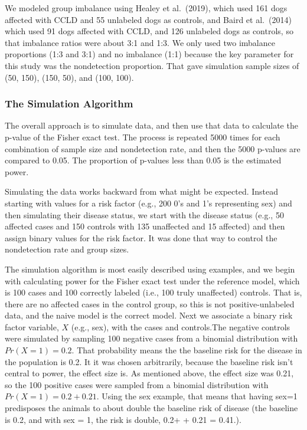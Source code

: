 \documentclass[
]{article}
\begin{document}
We modeled group imbalance using Healey et al.~(2019), which used 161
dogs affected with CCLD and 55 unlabeled dogs as controls, and Baird et
al.~(2014) which used 91 dogs affected with CCLD, and 126 unlabeled dogs
as controls, so that imbalance ratios were about 3:1 and 1:3.
\cite{bcioa14} \cite{hmhcbhkr19} We only used two imbalance proportions
(1:3 and 3:1) and no imbalance (1:1) because the key parameter for this
study was the nondetection proportion. That gave simulation sample sizes
of (50, 150), (150, 50), and (100, 100).

\pagebreak

\hypertarget{the-simulation-algorithm}{%
\subsubsection{The Simulation
Algorithm}\label{the-simulation-algorithm}}

The overall approach is to simulate data, and then use that data to
calculate the p-value of the Fisher exact test. The process is repeated
5000 times for each combination of sample size and nondetection rate,
and then the 5000 p-values are compared to 0.05. The proportion of
p-values less than 0.05 is the estimated power.

Simulating the data works backward from what might be expected. Instead
starting with values for a risk factor (e.g., 200 0's and 1's
representing sex) and then simulating their disease status, we start
with the disease status (e.g., 50 affected cases and 150 controls with
135 unaffected and 15 affected) and then assign binary values for the
risk factor. It was done that way to control the nondetection rate and
group sizes.

The simulation algorithm is most easily described using examples, and we
begin with calculating power for the Fisher exact test under the
reference model, which is 100 cases and 100 correctly labeled (i.e., 100
truly unaffected) controls. That is, there are no affected cases in the
control group, so this is not positive-unlabeled data, and the naive
model is the correct model. Next we associate a binary risk factor
variable, \(X\) (e.g., sex), with the cases and controls.The negative
controls were simulated by sampling 100 negative cases from a binomial
distribution with \(Pr(X=1) = 0.2\). That probability means the the
baseline risk for the disease in the population is 0.2. It it was chosen
arbitrarily, because the baseline risk isn't central to power, the
effect size is. As mentioned above, the effect size was 0.21, so the 100
positive cases were sampled from a binomial distribution with
\(Pr(X=1) = 0.2 + 0.21\). Using the sex example, that means that having
sex=1 predisposes the animals to about double the baseline risk of
disease (the baseline is 0.2, and with sex = 1, the risk is double, 0.2+
+ 0.21 = 0.41.).
\end{document}
